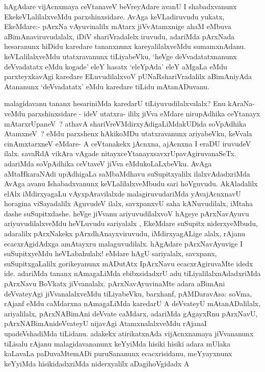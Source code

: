 \begin{artha}
hAgAdare vijAcnxmaya ceVtanaveV beVreyAdare avanU I shabadxvanunx
EkekeVLalilalxveMdu parxshinxsidare. AvAga keVLadiruvudu yukatx,
EkeMdare:- pArxNa vAyuvinalilx mAtarx jiVvAtamxnige ahaM eMbuva
aBimAnaviruvudalalx, iDiV shariVradalelx iruvudu, adariMda pArxNada
hesaranunx hiDidu karedare tananxnunx kareyalilalxveMdu sumamxnAdanu.
keVLalilalxveMdu utatxravanunx tiLiyabeVku, `heVge deVvadatatxnanunx
deVvadatatx eMdu kogade' eleY hasatx `eleYpAda' eleY aMgaLa eMdu
parxteyxkavAgi karedare ELuvudilalxvoV pUNaRshariVradalilx aBimAniyAda
Atananunx `deVvadatatx' eMdu karedare tiLidu mAtanADuvanu. 
\end{artha}

\begin{artha}
malagidavanu tananx hesariniMda karedarU tiLiyuvudilalxvalalx? Enu
kAraNa-veMdu parxshinxsidare - ideV utatxra- ililx jiVva eMdare
nirupAdhika ceYtanayx mAtarxrUpaneV~? athavA
shariVreVMdirxyAdigaLiMdakUDida soVpAdhika AtamxneV~? eMdu parxshenx
hAkikoMDu utatxravanunx ariyabeVku, keVvala cinAmxtarxneV eMdare- A
ceVtanakekx jAcnxna, ajAcnxna I eraDU iruvudeV ilalx. savaRdA vikAra
vAgade nitayxceYtanayxsavxrUpavAgiruvanaSeTx. adariMda soVpAdhika
ceVtaveV jiVva eMdukoLaLxbeVku. AvAga aMtaHkaraNAdi upAdhigaLa
saMbaMdhavu suSupitxyalilx ilalxvAdadxriMda AvAga avanu Ishabadxvanunx
keVLalilalxveMbudu sari hoVguvudu. AkAladalilx elAlx iMdirxyagaLu
vAyxpAravilalxde malagiruvudariMda yAvajAcnxnavU horagina viSayadalilx
AguvudeV ilalx, savxpanxvU saha kANuvudilalx, iMtaha dashe
suSupitxdashe. heVge jiVvanu ariyuvudilalxvoV hAgeye pArxNavAyuvu
ariyuvudilalxveMdu heVLuvudu sariyalalx , EkeMdare suSupitx
niderxyeMbudu, adaralilx pArxNakekx pArxdhAnayxviruvudu,
iMdirxyagALige alalx, rAjanu ecacxrAgidAdxga amAtayxru
malaguvudilalx. hAgAdare pArxNavAyuvige I suSupitxyeMdu heVLabahulalx! eMdare hAgU  sariyalalx, savxpanx, suSupitxgaLalilx gorikeyanunx
mADutAtx IpArxNavu ecacxrAgiruvaMte idedx ide. adariMda tananx
nAmagaLiMda ebibxsidadxrU adu tiLiyalilalxnAdadxriMda pArxNavu BoVkatx
jiVvanalalx. pArxNavAyuvinaMte adara aBimAni deVvateyAgi
jiVvanalalxveMdu tiLiyabeVku, barxhanf, pAMDaravAsa: soVma, rAjanf eMdu
caMdarxna nAmagaLiMda karedarU A deVvateyU mAtanADalilalx,
ariyalilalx, pArxNABimAni deVvate caMdarx, adariMda gAgayxRnu
pArxNavU, pArxNABimAnideVvateyU nijavAgi AtamxnalalxveMdu rAjanaI
upadeVshadiMda tiLidanu. adakekx atirikatxnAda vijAcnxnamaya
jiVvananunx tiLisalu rAjanu malagidavananunx keYyiMda hisiki hisiki
adara mUlaka kaLavaLa paDuvaMtemADi puruSananunx ecacxrisidanu,
meYyayxnunx keYyiMda hisikidadxriMda niderxyalilx aDagihoVgidadx A

\end{artha}
